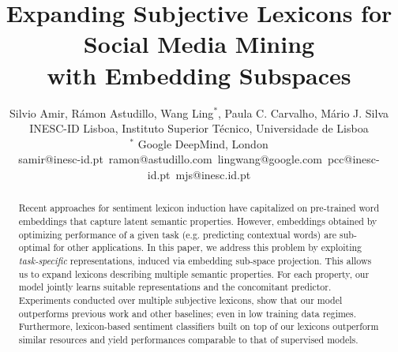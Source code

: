 \documentclass[letterpaper]{article}
\begin{document}
%
\title{Expanding Subjective Lexicons for Social Media Mining \\with Embedding Subspaces}


\author{Silvio Amir, Rámon Astudillo, Wang Ling$^{*}$, Paula C. Carvalho, Mário J. Silva\\
INESC-ID Lisboa, Instituto Superior Técnico, Universidade de Lisboa\\
$^{*}$ Google DeepMind, London \\ 
{samir@inesc-id.pt~ramon@astudillo.com~lingwang@google.com~pcc@inesc-id.pt~mjs@inesc.id.pt}\\
}

\maketitle
\begin{abstract}

Recent approaches for sentiment lexicon induction have capitalized on pre-trained word embeddings that capture latent semantic properties. However, embeddings obtained by optimizing performance of a given task (e.g. predicting contextual words) are sub-optimal for other applications. In this paper, we address this problem by exploiting \textit{task-specific} representations, induced via embedding sub-space projection. This allows us to expand lexicons describing multiple semantic properties. For each property, our model jointly learns suitable representations and the concomitant predictor. Experiments conducted over multiple subjective lexicons, show that our model outperforms previous work and other baselines; even in low training data regimes. Furthermore, lexicon-based sentiment classifiers built on top of our lexicons outperform similar resources and yield performances comparable to that of supervised models.


\end{abstract}
\end{document}
